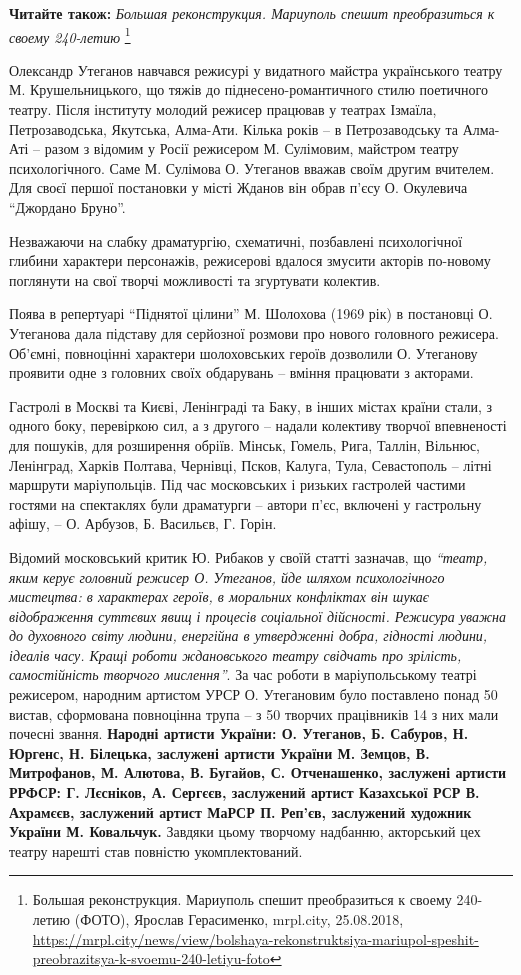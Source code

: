 \textbf{Читайте також:} \emph{Большая реконструкция. Мариуполь спешит преобразиться к своему 240-летию}%
\footnote{Большая реконструкция. Мариуполь спешит преобразиться к своему 240-летию (ФОТО), Ярослав Герасименко, mrpl.city, 25.08.2018, \url{https://mrpl.city/news/view/bolshaya-rekonstruktsiya-mariupol-speshit-preobrazitsya-k-svoemu-240-letiyu-foto}}

Олександр Утеганов навчався режисурі у видатного майстра українського театру М.
Крушельницького, що тяжів до піднесено-романтичного стилю поетичного театру.
Після інституту молодий режисер працював у театрах Ізмаїла, Петрозаводська,
Якутська, Алма-Ати. Кілька років – в Петрозаводську та Алма-Аті – разом з
відомим у Росії режисером М. Сулімовим, майстром театру психологічного. Саме М.
Сулімова О. Утеганов вважав своїм другим вчителем. Для своєї першої постановки
у місті Жданов він обрав п'єсу О. Окулевича \enquote{Джордано Бруно}.

Незважаючи на слабку драматургію, схематичні, позбавлені психологічної глибини
характери персонажів, режисерові вдалося змусити акторів по-новому поглянути на
свої творчі можливості та згуртувати колектив.

Поява в репертуарі \enquote{Піднятої цілини} М. Шолохова (1969 рік) в постановці О.
Утеганова дала підставу для серйозної розмови про нового головного режисера.
Об'ємні, повноцінні характери шолоховських героїв дозволили О. Утеганову
проявити одне з головних своїх обдарувань – вміння працювати з акторами.

Гастролі в Москві та Києві, Ленінграді та Баку, в інших містах країни стали, з
одного боку, перевіркою сил, а з другого – надали колективу творчої впевненості
для пошуків, для розширення обріїв. Мінськ, Гомель, Рига, Таллін, Вільнюс,
Ленінград, Харків Полтава, Чернівці, Псков, Калуга, Тула, Севастополь – літні
маршрути маріупольців. Під час московських і ризьких гастролей частими гостями
на спектаклях були драматурги – автори п'єс, включені у гастрольну афішу, – О.
Арбузов, Б. Васильєв, Г. Горін.


Відомий московський критик Ю. Рибаков у своїй статті зазначав, що \emph{\enquote{театр, яким
керує головний режисер О. Утеганов, йде шляхом психологічного мистецтва: в
характерах героїв, в моральних конфліктах він шукає відображення суттєвих явищ
і процесів соціальної дійсності. Режисура уважна до духовного світу людини,
енергійна в утвердженні добра, гідності людини, ідеалів часу. Кращі роботи
ждановського театру свідчать про зрілість, самостійність творчого мислення}}. За
час роботи в маріупольському театрі режисером, народним артистом УРСР О.
Утегановим було поставлено понад 50 вистав, сформована повноцінна трупа – з 50
творчих працівників 14 з них мали почесні звання. \textbf{Народні артисти України: О.
Утеганов, Б. Сабуров, Н. Юргенс, Н. Білецька, заслужені артисти України М.
Земцов, В. Митрофанов, М. Алютова, В. Бугайов, С. Отченашенко, заслужені
артисти РРФСР: Г. Лєсніков, А. Сергєєв, заслужений артист Казахської РСР В.
Ахрамєєв, заслужений артист МаРСР П. Реп'єв, заслужений художник України М.
Ковальчук.} Завдяки цьому творчому надбанню, акторський цех театру нарешті став
повністю укомплектований.

